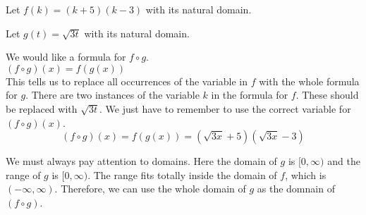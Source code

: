 \documentclass{ximera}
\begin{document}
\begin{example}


Let $f(k) = (k + 5)(k - 3)$ with its natural domain.


Let $g(t) = \sqrt{3t}$ with its natural domain.



\begin{explanation}

We would like a formula for $f \circ g$. \\

$(f \circ g)(x) = f(g(x))$ \\

This tells us to replace all occurrences of the variable in $f$ with the whole formula for $g$.  There are two instances of the variable $k$ in the formula for $f$.  These should be replaced with $\sqrt{3t}$. We just have to remember to use the correct variable for $(f \circ g)(x)$. \\



\[
(f \circ g)(x) = f(g(x)) = (\sqrt{3x} + 5)(\sqrt{3x} - 3)
\]




\end{explanation}


\begin{observation}


We must always pay attention to domains.  Here the domain of $g$ is $[0, \infty)$ and the range of $g$ is $[0, \infty)$.  The range fits totally inside the domain of $f$, which is $(-\infty, \infty)$.  Therefore, we can use the whole domain of $g$ as the domnain of $(f \circ g)$.

\end{observation}


\end{example}
\end{document}

